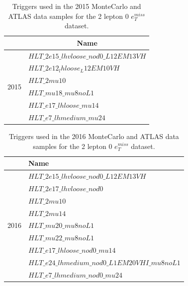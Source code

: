 \begin{table}[H]
    \centering
    \caption[2015 triggers table]{Triggers used in the 2015 MonteCarlo and ATLAS data samples for the 2 lepton 0 $e_T^{miss}$ dataset.}
    \label{tab:triggers2015}
    \begin{tabular}{|l|l|}
    \hline
                          & \multicolumn{1}{c|}{Name}              \\ \hline
    \multirow{6}{*}{2015} & $HLT\_2e15\_lhvloose\_nod0\_L12EM13VH$ \\ \cline{2-2} 
                          & $HLT\_2e12_lhloose_L12EM10VH$          \\ \cline{2-2} 
                          & $HLT\_2mu10$                           \\ \cline{2-2} 
                          & $HLT\_mu18\_mu8noL1$                   \\ \cline{2-2} 
                          & $HLT\_e17\_lhloose\_mu14$              \\ \cline{2-2} 
                          & $HLT\_e7\_lhmedium\_mu24$              \\ \hline
    \end{tabular}
    \end{table}



\begin{table}[H]
    \centering
    \caption[2016 triggers table]{Triggers used in the 2016 MonteCarlo and ATLAS data samples for the 2 lepton 0 $e_T^{miss}$ dataset.}
    \label{tab:triggers2016}
    \begin{tabular}{|l|l|}
    \hline
                          & Name  \\ \hline
    \multirow{9}{*}{2016} & $HLT\_2e15\_lhvloose\_nod0\_L12EM13VH$                 \\ \cline{2-2} 
                          & $HLT\_2e17\_lhvloose\_nod0$                   \\ \cline{2-2} 
                          & $HLT\_2mu10$                  \\ \cline{2-2} 
                          & $HLT\_2mu14$                  \\ \cline{2-2} 
                          & $HLT\_mu20\_mu8noL1$                  \\ \cline{2-2} 
                          & $HLT\_mu22\_mu8noL1$                 \\ \cline{2-2} 
                          & $HLT\_e17\_lhloose\_nod0\_mu14$                   \\ \cline{2-2} 
                          & $HLT\_e24\_lhmedium\_nod0\_L1EM20VHI\_mu8noL1$                  \\ \cline{2-2} 
                          & $HLT\_e7\_lhmedium\_nod0\_mu24$                   \\ \hline
    \end{tabular}
    \end{table}




